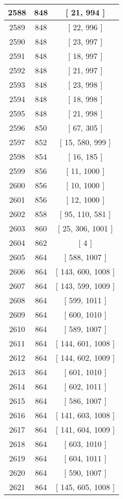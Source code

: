 \begin{center}
\begin{longtable}[H]{|| c c c ||}
2588 & 848 & [ 21, 994 ] \\ 
\hline
2589 & 848 & [ 22, 996 ] \\ 
\hline
2590 & 848 & [ 23, 997 ] \\ 
\hline
2591 & 848 & [ 18, 997 ] \\ 
\hline
2592 & 848 & [ 21, 997 ] \\ 
\hline
2593 & 848 & [ 23, 998 ] \\ 
\hline
2594 & 848 & [ 18, 998 ] \\ 
\hline
2595 & 848 & [ 21, 998 ] \\ 
\hline
2596 & 850 & [ 67, 305 ] \\ 
\hline
2597 & 852 & [ 15, 580, 999 ] \\ 
\hline
2598 & 854 & [ 16, 185 ] \\ 
\hline
2599 & 856 & [ 11, 1000 ] \\ 
\hline
2600 & 856 & [ 10, 1000 ] \\ 
\hline
2601 & 856 & [ 12, 1000 ] \\ 
\hline
2602 & 858 & [ 95, 110, 581 ] \\ 
\hline
2603 & 860 & [ 25, 306, 1001 ] \\ 
\hline
2604 & 862 & [ 4 ] \\ 
\hline
2605 & 864 & [ 588, 1007 ] \\ 
\hline
2606 & 864 & [ 143, 600, 1008 ] \\ 
\hline
2607 & 864 & [ 143, 599, 1009 ] \\ 
\hline
2608 & 864 & [ 599, 1011 ] \\ 
\hline
2609 & 864 & [ 600, 1010 ] \\ 
\hline
2610 & 864 & [ 589, 1007 ] \\ 
\hline
2611 & 864 & [ 144, 601, 1008 ] \\ 
\hline
2612 & 864 & [ 144, 602, 1009 ] \\ 
\hline
2613 & 864 & [ 601, 1010 ] \\ 
\hline
2614 & 864 & [ 602, 1011 ] \\ 
\hline
2615 & 864 & [ 586, 1007 ] \\ 
\hline
2616 & 864 & [ 141, 603, 1008 ] \\ 
\hline
2617 & 864 & [ 141, 604, 1009 ] \\ 
\hline
2618 & 864 & [ 603, 1010 ] \\ 
\hline
2619 & 864 & [ 604, 1011 ] \\ 
\hline
2620 & 864 & [ 590, 1007 ] \\ 
\hline
2621 & 864 & [ 145, 605, 1008 ] \\ 

\end{longtable}
\end{center}
